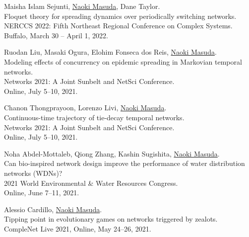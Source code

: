 \documentclass[11pt,letter]{article}
\begin{document}
\begin{etaremune}
\item Maisha Islam Sejunti, \underline{Naoki Masuda}, Dane Taylor.\\
Floquet theory for spreading dynamics over periodically switching networks.\\
NERCCS 2022: Fifth Northeast Regional Conference on Complex Systems.\\
Buffalo, March 30 -- April 1, 2022.


\item Ruodan Liu, Masaki Ogura, Elohim Fonseca dos Reis, \underline{Naoki Masuda}.\\
Modeling effects of concurrency on epidemic spreading in Markovian temporal networks.\\
Networks 2021: A Joint Sunbelt and NetSci Conference.\\
Online, July 5--10, 2021.

\item Chanon Thongprayoon, Lorenzo Livi, \underline{Naoki Masuda}.\\
Continuous-time trajectory of tie-decay temporal networks.\\
Networks 2021: A Joint Sunbelt and NetSci Conference.\\
Online, July 5--10, 2021.

\item Noha Abdel-Mottaleb, Qiong Zhang, Kashin Sugishita, \underline{Naoki Masuda}.\\
Can bio-inspired network design improve the performance of water distribution networks (WDNs)?\\
2021 World Environmental \& Water Resources Congress.\\
Online, June 7--11, 2021.

\item Alessio Cardillo, \underline{Naoki Masuda}.\\
Tipping point in evolutionary games on networks triggered by zealots.\\
CompleNet Live 2021, Online, May 24--26, 2021.\\


\end{etaremune}
\end{document}
